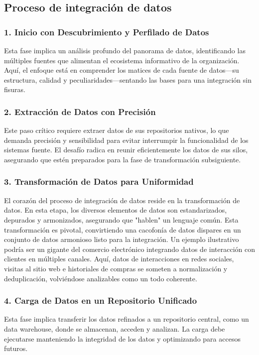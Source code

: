 \documentclass[12pt]{book}
\begin{document}
\subsection{Proceso de integración de datos}
\subsubsection{1. Inicio con Descubrimiento y Perfilado de Datos}
Esta fase implica un análisis profundo del panorama de datos, identificando las múltiples fuentes que alimentan el ecosistema informativo de la organización. Aquí, el enfoque está en comprender los matices de cada fuente de datos—su estructura, calidad y peculiaridades—sentando las bases para una integración sin fisuras.
\subsubsection{2. Extracción de Datos con Precisión}
Este paso crítico requiere extraer datos de sus repositorios nativos, lo que demanda precisión y sensibilidad para evitar interrumpir la funcionalidad de los sistemas fuente. El desafío radica en reunir eficientemente los datos de sus silos, asegurando que estén preparados para la fase de transformación subsiguiente.
\subsubsection{3. Transformación de Datos para Uniformidad}
El corazón del proceso de integración de datos reside en la transformación de datos. En esta etapa, los diversos elementos de datos son estandarizados, depurados y armonizados, asegurando que "hablen" un lenguaje común. Esta transformación es pivotal, convirtiendo una cacofonía de datos dispares en un conjunto de datos armonioso listo para la integración.
Un ejemplo ilustrativo podría ser un gigante del comercio electrónico integrando datos de interacción con clientes en múltiples canales. Aquí, datos de interacciones en redes sociales, visitas al sitio web e historiales de compras se someten a normalización y deduplicación, volviéndose analizables como un todo coherente.
\subsubsection{4. Carga de Datos en un Repositorio Unificado}
Esta fase implica transferir los datos refinados a un repositorio central, como un data warehouse, donde se almacenan, acceden y analizan. La carga debe ejecutarse manteniendo la integridad de los datos y optimizando para accesos futuros.
\end{document}
